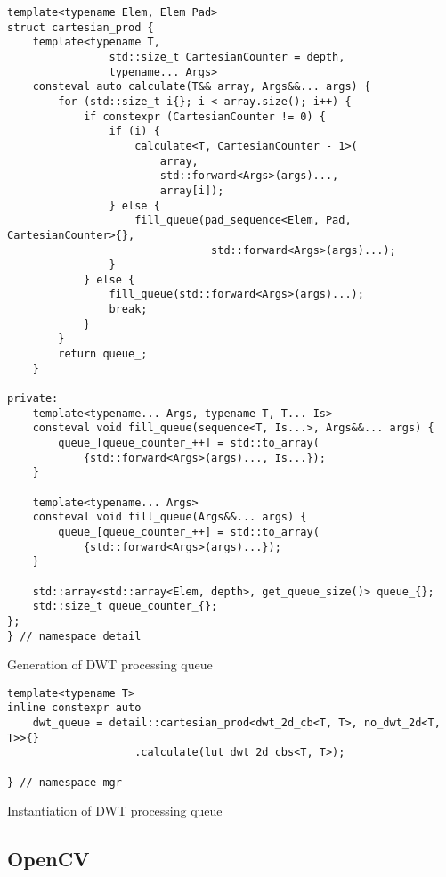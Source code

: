 \begin{listing}[!htb]
\begin{verbatim}
template<typename Elem, Elem Pad>
struct cartesian_prod {
    template<typename T,
                std::size_t CartesianCounter = depth,
                typename... Args>
    consteval auto calculate(T&& array, Args&&... args) {
        for (std::size_t i{}; i < array.size(); i++) {
            if constexpr (CartesianCounter != 0) {
                if (i) {
                    calculate<T, CartesianCounter - 1>(
                        array,
                        std::forward<Args>(args)...,
                        array[i]);
                } else {
                    fill_queue(pad_sequence<Elem, Pad, CartesianCounter>{},
                                std::forward<Args>(args)...);
                }
            } else {
                fill_queue(std::forward<Args>(args)...);
                break;
            }
        }
        return queue_;
    }

private:
    template<typename... Args, typename T, T... Is>
    consteval void fill_queue(sequence<T, Is...>, Args&&... args) {
        queue_[queue_counter_++] = std::to_array(
            {std::forward<Args>(args)..., Is...});
    }

    template<typename... Args>
    consteval void fill_queue(Args&&... args) {
        queue_[queue_counter_++] = std::to_array(
            {std::forward<Args>(args)...});
    }

    std::array<std::array<Elem, depth>, get_queue_size()> queue_{};
    std::size_t queue_counter_{};
};
} // namespace detail
\end{verbatim}
\caption{Generation of DWT processing queue}
\label{lst:dwt_queue}
\end{listing}

\begin{listing}[!htb]
\begin{verbatim}
template<typename T>
inline constexpr auto
    dwt_queue = detail::cartesian_prod<dwt_2d_cb<T, T>, no_dwt_2d<T, T>>{}
                    .calculate(lut_dwt_2d_cbs<T, T>);

} // namespace mgr
\end{verbatim}
\caption{Instantiation of DWT processing queue}
\label{lst:dwt_queue_instantiation}
\end{listing}

\subsection{OpenCV}


